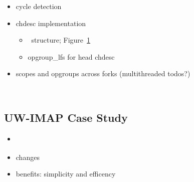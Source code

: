 \begin{itemize}
\item cycle detection
\item chdesc implementation
  \begin{itemize}
  \item \chdesc\ structure; Figure~\ref{fig:opgroup-chdescs}
  \item opgroup\_lfs for head chdesc
  \end{itemize}
\item scopes and opgroups across forks (multithreaded todos?)
\end{itemize}

\begin{figure}[htb]
\caption{\label{fig:opgroup-chdescs} \Opgroup\ \Chdescs}
\end{figure}

\subsection{UW-IMAP Case Study}
\label{sec:opgroup:uwimap}
\begin{itemize}
\item \cite{rfc3501}
\item changes
\item benefits: simplicity and efficency
\end{itemize}

